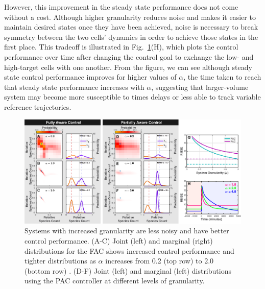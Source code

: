 \documentclass[12pt]{iopart}
\begin{document}
However, this improvement in the steady state performance does not come without a cost. Although higher granularity reduces noise and makes it easier to maintain desired states once they have been achieved, noise is necessary to break symmetry between the two cells' dynamics in order to achieve those states in the first place. This tradeoff is illustrated in Fig.\ \ref{Volume}(H), which plots the control performance over time after changing the control goal to exchange the low- and high-target cells with one another.  From the figure, we can see although steady state control performance improves for higher values of $\alpha$, the time taken to reach that steady state performance  increases with $\alpha$, suggesting that larger-volume system may become more susceptible to times delays or less able to track variable reference trajectories.

\begin{figure}[t!]
\begin{center}
\includegraphics[width=1\textwidth]{Granularity.pdf}
\vspace{-0.1in}
\caption{Systems with increased granularity are less noisy and have better control performance. (A-C) Joint (left) and marginal (right) distributions for the FAC shows increased control performance and tighter distributions as $\alpha$ increases from 0.2 (top row) to 2.0 (bottom row) . (D-F) Joint (left) and marginal (left) distributions using the PAC controller at different levels of granularity.}
\label{Volume}
\end{center}
\vspace{-0.2in}
\end{figure}



\end{document}
